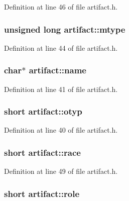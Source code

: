 Definition at line 46 of file artifact.\+h.

\hypertarget{structartifact_ac45908831018212e1f1b37cca82b4d31}{
\subsubsection[{mtype}]{\setlength{\rightskip}{0pt plus 5cm}unsigned long artifact\+::mtype}}\label{structartifact_ac45908831018212e1f1b37cca82b4d31}


Definition at line 44 of file artifact.\+h.

\hypertarget{structartifact_aca63472a0bf308d340bc3460256f0b6d}{
\subsubsection[{name}]{ char$\ast$ artifact\+::name}}\label{structartifact_aca63472a0bf308d340bc3460256f0b6d}


Definition at line 41 of file artifact.\+h.

\hypertarget{structartifact_a23c01e9db7d5dacfdc29585d8b28e63f}{
\subsubsection[{otyp}]{\setlength{\rightskip}{0pt plus 5cm}short artifact\+::otyp}}\label{structartifact_a23c01e9db7d5dacfdc29585d8b28e63f}


Definition at line 40 of file artifact.\+h.

\hypertarget{structartifact_abb798b7eee13d59647904fd323b82fd7}{
\subsubsection[{race}]{\setlength{\rightskip}{0pt plus 5cm}short artifact\+::race}}\label{structartifact_abb798b7eee13d59647904fd323b82fd7}


Definition at line 49 of file artifact.\+h.

\hypertarget{structartifact_a3cf36797d1c15e0e2852d4d412cb720b}{
\subsubsection[{role}]{\setlength{\rightskip}{0pt plus 5cm}short artifact\+::role}}\label{structartifact_a3cf36797d1c15e0e2852d4d412cb720b}


